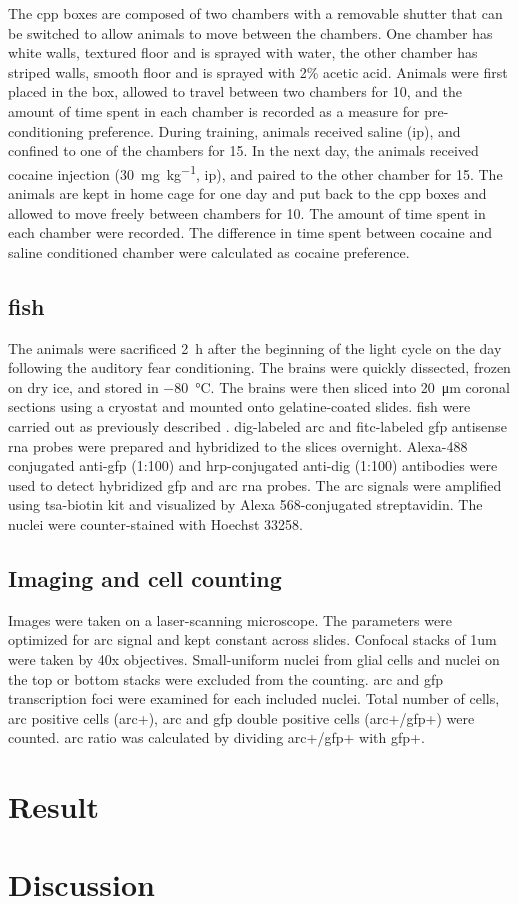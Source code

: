  The \gls{cpp} boxes are composed of two chambers with a removable shutter that can be switched to allow animals to move between the chambers. One chamber has white walls, textured floor and is sprayed with water, the other chamber has striped walls, smooth floor and is sprayed with 2\% acetic acid. Animals were first placed in the box, allowed to travel between two chambers for \SI{10}{\min}, and the amount of time spent in each chamber is recorded as a measure for pre-conditioning preference. During training, animals received saline (\gls{ip}), and confined to one of the chambers for \SI{15}{\min}. In the next day, the animals received cocaine injection (\SI{30}{\mg\per\kg}, \gls{ip}), and paired to the other chamber for \SI{15}{\min}. The animals are kept in home cage for one day and put back to the \gls{cpp} boxes and allowed to move freely between chambers for \SI{10}{\min}. The amount of time spent in each chamber were recorded. The difference in time spent between cocaine and saline conditioned chamber were calculated as cocaine preference.

\subsection{\Acrlong{fish}}
The animals were sacrificed \SI{2}{\hour} after the beginning of the light cycle on the day following the auditory fear conditioning. The brains were quickly dissected, frozen on dry ice, and stored in \SI{-80}{\celsius}. The brains were then sliced into \SI{20}{\um} coronal sections using a cryostat and mounted onto gelatine-coated slides. \Gls{fish} were carried out as previously described \citep{guzowski99}. \gls{dig}-labeled \gls{arc} and \gls{fitc}-labeled \gls{gfp} antisense \gls{rna} probes were prepared and hybridized to the slices overnight. Alexa-488 conjugated anti-\gls{gfp} (1:100) and \gls{hrp}-conjugated anti-\gls{dig} (1:100) antibodies were used to detect hybridized \gls{gfp} and \gls{arc} \gls{rna} probes. The \gls{arc} signals were amplified using \gls{tsa}-biotin kit and visualized by Alexa 568-conjugated streptavidin. The nuclei were counter-stained with Hoechst 33258.

\subsection{Imaging and cell counting}
Images were taken on a laser-scanning microscope. The parameters were optimized for \gls{arc} signal and kept constant across slides. Confocal stacks of 1um were taken by 40x objectives. Small-uniform nuclei from glial cells and nuclei on the top or bottom stacks were excluded from the counting. \gls{arc} and \gls{gfp} transcription foci  were examined for each included nuclei. Total number of cells, \gls{arc} positive cells (\gls{arc}+), \gls{arc} and \gls{gfp} double positive cells (\gls{arc}+/\gls{gfp}+) were counted. \gls{arc} ratio was calculated by dividing \gls{arc}+/\gls{gfp}+ with \gls{gfp}+.

\section{Result}
\section{Discussion}
